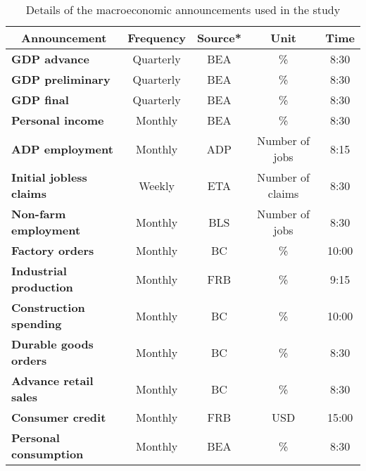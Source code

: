 \begin{table}[] 
\begin{center}
\caption{Details of the macroeconomic announcements used in the study}
\label{tab:stat1}
\begin{tabular}{@{}lcccc@{}}
\toprule
\multicolumn{1}{c}{\textbf{Announcement}} & \textbf{Frequency} & \textbf{Source*} & \textbf{Unit}     & \textbf{Time} \\ \midrule
\textbf{GDP advance}                      & Quarterly          & BEA             & \%                & 8:30          \\
\textbf{GDP preliminary}                  & Quarterly          & BEA             & \%                & 8:30          \\
\textbf{GDP final}                        & Quarterly          & BEA             & \%                & 8:30          \\
\textbf{Personal income}                  & Monthly            & BEA             & \%                & 8:30          \\
\textbf{ADP employment}                   & Monthly            & ADP             & Number of jobs    & 8:15          \\
\textbf{Initial jobless claims}           & Weekly             & ETA             & Number of claims  & 8:30          \\
\textbf{Non-farm employment}              & Monthly            & BLS             & Number of jobs    & 8:30          \\
\textbf{Factory orders}                   & Monthly            & BC              & \%                & 10:00         \\
\textbf{Industrial production}            & Monthly            & FRB             & \%                & 9:15          \\
\textbf{Construction spending}            & Monthly            & BC              & \%                & 10:00         \\
\textbf{Durable goods orders}             & Monthly            & BC              & \%                & 8:30          \\
\textbf{Advance retail sales}             & Monthly            & BC              & \%                & 8:30          \\
\textbf{Consumer credit}                  & Monthly            & FRB             & USD               & 15:00         \\
\textbf{Personal consumption}             & Monthly            & BEA             & \%                & 8:30          \\

\end{tabular}
\end{center}
\end{table}
